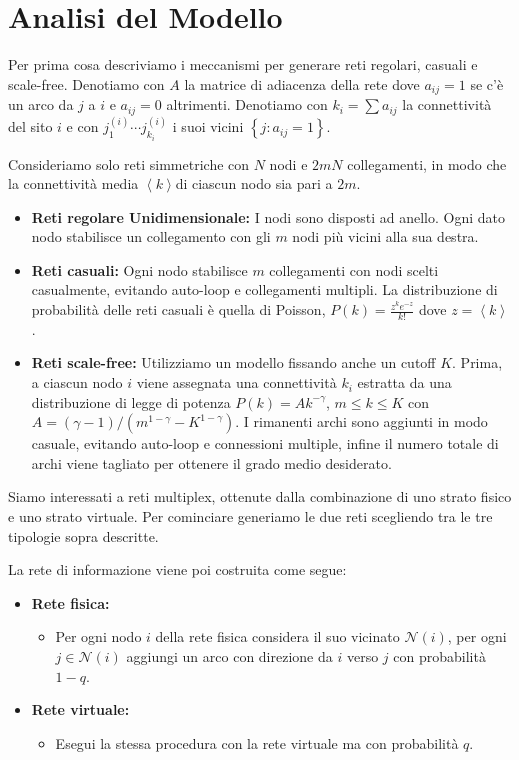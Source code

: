 \section{Analisi del Modello}\label{sec:analisi-del-modello}

Per prima cosa descriviamo i meccanismi per generare reti regolari, casuali e scale-free.
Denotiamo con $A$ la matrice di adiacenza della rete dove $a_{ij} = 1$ se c'è un arco da
$j$ a $i$ e $a_{ij} = 0$ altrimenti.
Denotiamo con $k_i = \sum a_{ij}$ la connettività del sito $i$ e 
con $j^{(i)}_{1}\cdots j^{(i)}_{k_{i}}$ i suoi vicini $\left\{ j : a_{ij}=1 \right\}$.

Consideriamo solo reti simmetriche con $N$ nodi e $2mN$ collegamenti, in modo che la connettività media 
$\left\langle k \right\rangle$di ciascun nodo sia pari a $2m$.

\begin{itemize}
    \item \textbf{Reti regolare Unidimensionale:} I nodi sono disposti ad anello.
        Ogni dato nodo stabilisce un collegamento con gli $m$ nodi più vicini alla sua destra.
    \item \textbf{Reti casuali:} Ogni nodo stabilisce $m$ collegamenti con nodi scelti casualmente, evitando auto-loop e collegamenti multipli.
        La distribuzione di probabilità delle reti casuali è quella di Poisson, $P(k) = \frac{z^k e^{-z}}{k!}$ dove $z =\left\langle k \right\rangle$.
    \item \textbf{Reti scale-free:} Utilizziamo un modello fissando anche un cutoff $K$.
        Prima, a ciascun nodo $i$ viene assegnata una connettività $k_i$ estratta da una distribuzione di legge di potenza $P(k) = A k^{-\gamma}$, $m \leq k \leq K$ con $A=(\gamma -1)/(m^{1-\gamma} -K^{1-\gamma})$.
        I rimanenti archi sono aggiunti in modo casuale, evitando auto-loop e connessioni multiple, infine il numero totale di archi viene tagliato per ottenere il grado medio desiderato.
\end{itemize}

Siamo interessati a reti multiplex, ottenute dalla combinazione di uno strato fisico e uno strato virtuale.
Per cominciare generiamo le due reti scegliendo tra le tre tipologie sopra descritte.

La rete di informazione viene poi costruita come segue:
\begin{itemize}
    \item \textbf{Rete fisica:}
        \begin{itemize}
            \item Per ogni nodo $i$ della rete fisica considera il suo vicinato $\mathcal{N}(i)$, per ogni $j\in \mathcal{N}(i)$
                aggiungi un arco con direzione da $i$ verso $j$ con probabilità $1-q$.
        \end{itemize}
    \item \textbf{Rete virtuale:}
        \begin{itemize}
            \item Esegui la stessa procedura con la rete virtuale ma con probabilità $q$.
        \end{itemize}
\end{itemize}

